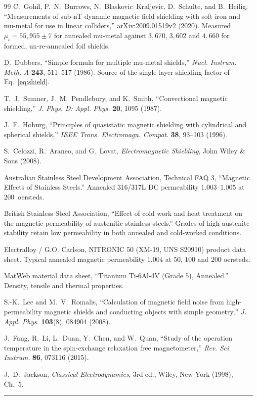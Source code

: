 \documentclass[11pt]{article}
\newcommand{\band}{\begin{center}\rule{\linewidth}{0.8pt}\end{center}}
\begin{document}
\begin{thebibliography}{99}
 C.~Gohil, P.~N.~Burrows, N.~Blaskovic~Kraljevic, D.~Schulte,
and B.~Heilig, ``Measurements of sub-nT dynamic magnetic field shielding with
soft iron and mu-metal for use in linear colliders,'' arXiv:2009.01519v2 (2020).
Measured $\mu_i=55{,}955\pm7$ for annealed mu-metal against $3{,}670$, $3{,}602$
and $4{,}660$ for formed, un-re-annealed foil shields.

 D.~Dubbers, ``Simple formula for multiple mu-metal
shields,'' \emph{Nucl. Instrum. Meth. A} \textbf{243}, 511--517 (1986). Source
of the single-layer shielding factor of Eq.~\eqref{eq:shield}.

 T.~J.~Sumner, J.~M.~Pendlebury, and K.~Smith, ``Convectional
magnetic shielding,'' \emph{J. Phys. D: Appl. Phys.} \textbf{20}, 1095 (1987).

 J.~F.~Hoburg, ``Principles of quasistatic magnetic
shielding with cylindrical and spherical shields,'' \emph{IEEE Trans.
Electromagn. Compat.} \textbf{38}, 93--103 (1996).

 S.~Celozzi, R.~Araneo, and G.~Lovat, \emph{Electromagnetic
Shielding}, John Wiley \& Sons (2008).

 Australian Stainless Steel Development Association, Technical
FAQ 3, ``Magnetic Effects of Stainless Steels.'' Annealed 316/317L DC
permeability $1.003$--$1.005$ at $200$~oersteds.

 British Stainless Steel Association, ``Effect of cold work and
heat treatment on the magnetic permeability of austenitic stainless steels.''
Grades of high austenite stability retain low permeability in both annealed and
cold-worked conditions.

 Electralloy / G.O. Carlson, NITRONIC 50 (XM-19,
UNS S20910) product data sheet. Typical annealed magnetic permeability $1.004$
at $50$, $100$ and $200$ oersteds.

 MatWeb material data sheet, ``Titanium Ti-6Al-4V (Grade 5),
Annealed.'' Density, tensile and thermal properties.

 S.-K.~Lee and M.~V.~Romalis, ``Calculation of magnetic field
noise from high-permeability magnetic shields and conducting objects with simple
geometry,'' \emph{J. Appl. Phys.} \textbf{103}(8), 084904 (2008).

 J.~Fang, R.~Li, L.~Duan, Y.~Chen, and W.~Quan, ``Study of the
operation temperature in the spin-exchange relaxation free magnetometer,''
\emph{Rev. Sci. Instrum.} \textbf{86}, 073116 (2015).

 J.~D.~Jackson, \emph{Classical Electrodynamics}, 3rd ed.,
Wiley, New York (1998), Ch.~5.
\end{thebibliography}

\vfill
\band
\end{document}
